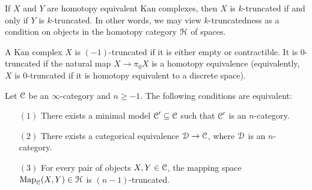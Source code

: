 \begin{remark}
If $X$ and $Y$ are homotopy equivalent Kan complexes, then $X$ is $k$-truncated if and only if $Y$ is $k$-truncated. In other words, we may view $k$-truncatedness as a condition on objects in the homotopy category $\operatorname{\mathcal{H}}$ of spaces.
\end{remark}

\begin{example}
A Kan complex $X$ is $(-1)$-truncated if it is either empty or contractible. It is $0$-truncated if the
natural map $X \rightarrow \pi_0 X$ is a homotopy equivalence (equivalently, $X$
is $0$-truncated if it is homotopy equivalent to a discrete space).
\end{example}

\begin{proposition}\label{tokerp}
Let $\operatorname{\mathcal{C}}$ be an $\infty$-category and $n \geq -1$. The following conditions are equivalent:
\begin{itemize}
\item[$(1)$] There exists a minimal model
$\operatorname{\mathcal{C}}' \subseteq \operatorname{\mathcal{C}}$ such that $\operatorname{\mathcal{C}}'$ is an $n$-category.
\item[$(2)$] There exists a categorical equivalence $\operatorname{\mathcal{D}} \rightarrow \operatorname{\mathcal{C}}$, where
$\operatorname{\mathcal{D}}$ is an $n$-category.
\item[$(3)$] For every pair of objects $X,Y \in \operatorname{\mathcal{C}}$, the mapping space
$\operatorname{{Map}}_{\operatorname{\mathcal{C}}}(X,Y) \in \operatorname{\mathcal{H}}$ is $(n-1)$-truncated.
\end{itemize}
\end{proposition}

